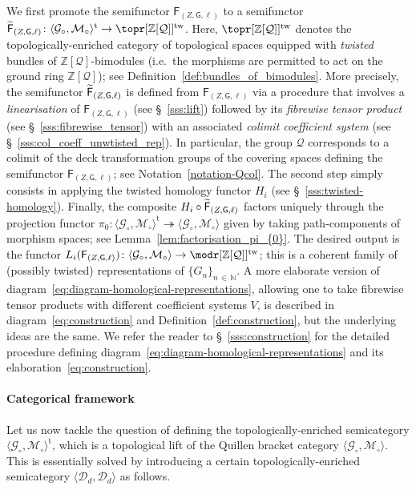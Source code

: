 \documentclass[AHL,Unicode,published]{cedram}
\newcommand{\tw}{\mathrm{tw}}
\newcommand{\mt}{\mathrm{t}}
\newcommand{\eF}{\mathsf{F}}
\newcommand{\sG}{\mathsf{G}}
\newcommand{\cD}{\mathcal{D}}
\newcommand{\cG}{\mathcal{G}}
\newcommand{\cM}{\mathcal{M}}
\newcommand{\cQ}{\mathcal{Q}}
\newcommand{\bN}{\mathbb{N}}
\newcommand{\bZ}{\mathbb{Z}}
\let\oldtilde\tilde
\renewcommand*{\tilde}[1]{\mathchoice{\widetilde{#1}}{\widetilde{#1}}{\oldtilde{#1}}{\oldtilde{#1}}}
\begin{document}
We first promote the semifunctor $\eF_{(Z,\sG,\ell)}$ to a semifunctor $\tilde{\eF}_{(Z,\sG,\ell)}\colon \langle \cG_{\circ}, \cM_{\circ} \rangle^{\mt} \to \topr[\bZ[\cQ]]^{\tw}$. Here, $\topr[\bZ[\cQ]]^{\tw}$ denotes the topologically-enriched category of topological spaces equipped with \emph{twisted} bundles of $\bZ[\cQ]$-bimodules (i.e.~the morphisms are permitted to act on the ground ring $\bZ[\cQ]$); see Definition~\ref{def:bundles_of_bimodules}. More precisely, the semifunctor $\tilde{\eF}_{(Z,\sG,\ell)}$ is defined from $\eF_{(Z,\sG,\ell)}$ via a procedure that involves a \emph{linearisation} of $\eF_{(Z,\sG,\ell)}$ (see \S~\ref{sss:lift}) followed by its \emph{fibrewise tensor product} (see \S~\ref{sss:fibrewise_tensor}) with an associated \emph{colimit coefficient system} (see \S~\ref{sss:col_coeff_unwtisted_rep}). In particular, the group $\cQ$ corresponds to a colimit of the deck transformation groups of the covering spaces defining the semifunctor $\eF_{(Z,\sG,\ell)}$; see Notation~\ref{notation-Qcol}. The second step simply consists in applying the twisted homology functor $H_{i}$ (see \S~\ref{sss:twisted-homology}). Finally, the composite $H_{i}\circ \tilde{\eF}_{(Z,\sG,\ell)}$ factors uniquely through the projection functor $\pi_{0}\colon \langle \cG_{\circ}, \cM_{\circ} \rangle^{\mt}\twoheadrightarrow \langle \cG_{\circ}, \cM_{\circ} \rangle$ given by taking path-components of morphism spaces; see Lemma~\ref{lem:factorisation_pi_{0}}. The desired output is the functor $L_{i}(\eF_{(Z,\sG,\ell)}) \colon \langle \cG_{\circ}, \cM_{\circ} \rangle \to \modr[{\bZ[\cQ]}]^{\tw}$; this is a coherent family of (possibly twisted) representations of $\{G_{n}\}_{n\,\in\,\bN}$. A more elaborate version of diagram~\eqref{eq:diagram-homological-representations}, allowing one to take fibrewise tensor products with different coefficient systems $V$, is described in diagram~\eqref{eq:construction} and Definition~\ref{def:construction}, but the underlying ideas are the same. We refer the reader to \S~\ref{sss:construction} for the detailed procedure defining diagram~\eqref{eq:diagram-homological-representations} and its elaboration~\eqref{eq:construction}.


\paragraph*{Categorical framework}
Let us now tackle the question of defining the topologi\-cally-enriched semicategory $\langle \cG_{\circ}, \cM_{\circ} \rangle^{\mt}$, which is a topological lift of the Quillen bracket category $\langle \cG_{\circ}, \cM_{\circ} \rangle$. This is essentially solved by introducing a certain topologi\-cally-enriched semicategory $\langle \cD_{d},\cD_{d} \rangle$ as follows.
\end{document}
